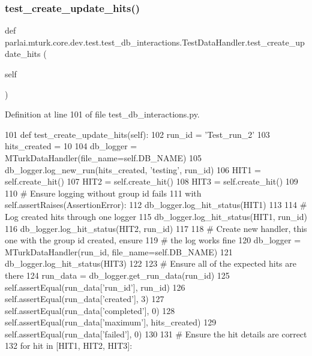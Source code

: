 \subsubsection{\texorpdfstring{test\+\_\+create\+\_\+update\+\_\+hits()}{test\_create\_update\_hits()}}
{\footnotesize\ttfamily def parlai.\+mturk.\+core.\+dev.\+test.\+test\+\_\+db\+\_\+interactions.\+Test\+Data\+Handler.\+test\+\_\+create\+\_\+update\+\_\+hits (\begin{DoxyParamCaption}\item[{}]{self }\end{DoxyParamCaption})}



Definition at line 101 of file test\+\_\+db\+\_\+interactions.\+py.


\begin{DoxyCode}
101     \textcolor{keyword}{def }test\_create\_update\_hits(self):
102         run\_id = \textcolor{stringliteral}{'Test\_run\_2'}
103         hits\_created = 10
104         db\_logger = MTurkDataHandler(file\_name=self.DB\_NAME)
105         db\_logger.log\_new\_run(hits\_created, \textcolor{stringliteral}{'testing'}, run\_id)
106         HIT1 = self.create\_hit()
107         HIT2 = self.create\_hit()
108         HIT3 = self.create\_hit()
109 
110         \textcolor{comment}{# Ensure logging without group id fails}
111         with self.assertRaises(AssertionError):
112             db\_logger.log\_hit\_status(HIT1)
113 
114         \textcolor{comment}{# Log created hits through one logger}
115         db\_logger.log\_hit\_status(HIT1, run\_id)
116         db\_logger.log\_hit\_status(HIT2, run\_id)
117 
118         \textcolor{comment}{# Create new handler, this one with the group id created, ensure}
119         \textcolor{comment}{# the log works fine}
120         db\_logger = MTurkDataHandler(run\_id, file\_name=self.DB\_NAME)
121         db\_logger.log\_hit\_status(HIT3)
122 
123         \textcolor{comment}{# Ensure all of the expected hits are there}
124         run\_data = db\_logger.get\_run\_data(run\_id)
125         self.assertEqual(run\_data[\textcolor{stringliteral}{'run\_id'}], run\_id)
126         self.assertEqual(run\_data[\textcolor{stringliteral}{'created'}], 3)
127         self.assertEqual(run\_data[\textcolor{stringliteral}{'completed'}], 0)
128         self.assertEqual(run\_data[\textcolor{stringliteral}{'maximum'}], hits\_created)
129         self.assertEqual(run\_data[\textcolor{stringliteral}{'failed'}], 0)
130 
131         \textcolor{comment}{# Ensure the hit details are correct}
132         \textcolor{keywordflow}{for} hit \textcolor{keywordflow}{in} [HIT1, HIT2, HIT3]:

\end{DoxyCode}
